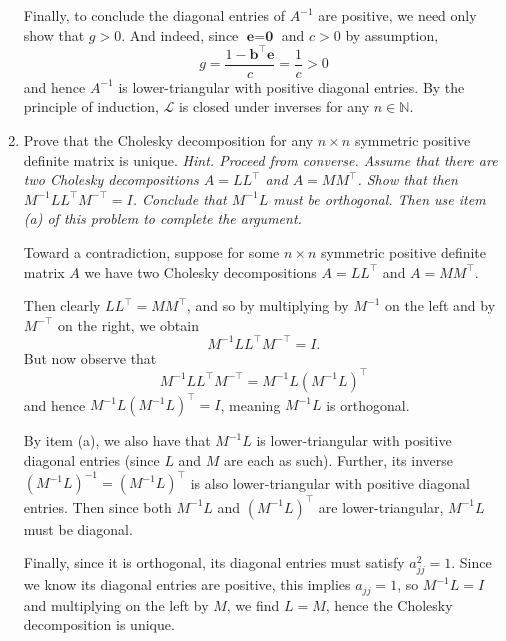 \documentclass{../../../kin_math}
\begin{document}
\begin{questions}
\begin{enumerate}
\begin{solution}
      Finally, to conclude the diagonal entries of $A^{-1}$ are positive, we need only show that $g > 0$. And indeed, since $\textbf{e} = \textbf{0}$ and $c > 0$ by assumption,
      \begin{equation*}
        g = \frac{1 - \textbf{b}^\top \textbf{e}}{c} = \frac{1}{c} > 0
      \end{equation*}
      and hence $A^{-1}$ is lower-triangular with positive diagonal entries. By the principle of induction, $\mathcal{L}$ is closed under inverses for any $n \in \mathbb{N}$.
    \end{solution}
    \item Prove that the Cholesky decomposition for any $n \times n$ symmetric positive definite matrix is unique. \emph{Hint. Proceed from converse. Assume that there are two Cholesky decompositions $A = LL^\top$ and $A = MM^\top$. Show that then $M^{-1}LL^\top M^{-\top} = I$. Conclude that $M^{-1}L$ must be orthogonal. Then use item (a) of this problem to complete the argument.}
    \begin{solution}
      Toward a contradiction, suppose for some $n \times n$ symmetric positive definite matrix $A$ we have two Cholesky decompositions $A = LL^\top$ and $A = MM^\top$.

      Then clearly $LL^\top = MM^\top$, and so by multiplying by $M^{-1}$ on the left and by $M^{-\top}$ on the right, we obtain
      \begin{equation*}
        M^{-1}LL^\top M^{-\top} = I.
      \end{equation*}
      But now observe that
      \begin{equation*}
        M^{-1}LL^\top M^{-\top} = M^{-1}L(M^{-1}L)^\top
      \end{equation*}
      and hence $M^{-1}L(M^{-1}L)^\top = I$, meaning $M^{-1}L$ is orthogonal.

      By item (a), we also have that $M^{-1}L$ is lower-triangular with positive diagonal entries (since $L$ and $M$ are each as such). Further, its inverse $(M^{-1} L)^{-1} = (M^{-1} L)^\top$ is also lower-triangular with positive diagonal entries. Then since both $M^{-1}L$ and $(M^{-1}L)^\top$ are lower-triangular, $M^{-1}L$ must be diagonal.

      Finally, since it is orthogonal, its diagonal entries must satisfy $a_{jj}^2 = 1$. Since we know its diagonal entries are positive, this implies $a_{jj} = 1$, so $M^{-1}L = I$ and multiplying on the left by $M$, we find $L = M$, hence the Cholesky decomposition is unique.
    \end{solution}
  \end{enumerate}


\end{questions}
\end{document}
